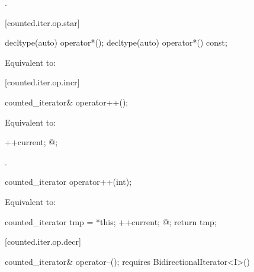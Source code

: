 \begin{itemdescr}
\pnum
\returns {}.
\end{itemdescr}

[counted.iter.op.star]{}

%
%
\begin{itemdecl}
decltype(auto) operator*();
decltype(auto) operator*() const;
\end{itemdecl}

\begin{itemdescr}
\pnum
\effects Equivalent to:
\end{itemdescr}

[counted.iter.op.incr]{}

%
%
\begin{itemdecl}
counted_iterator& operator++();
\end{itemdecl}

\begin{itemdescr}
\pnum
\requires {}

\pnum
\effects Equivalent to:
\begin{codeblock}
++current;
@\dcr@cnt;
\end{codeblock}

\pnum
\returns {}.
\end{itemdescr}

%
%
\begin{itemdecl}
counted_iterator operator++(int);
\end{itemdecl}

\begin{itemdescr}
\pnum
\requires {}

\pnum
\effects Equivalent to:
\begin{codeblock}
counted_iterator tmp = *this;
++current;
@\dcr@cnt;
return tmp;
\end{codeblock}
\end{itemdescr}

[counted.iter.op.decr]{}

%
%
\begin{itemdecl}
  counted_iterator& operator--();
    requires BidirectionalIterator<I>()
\end{itemdecl}

